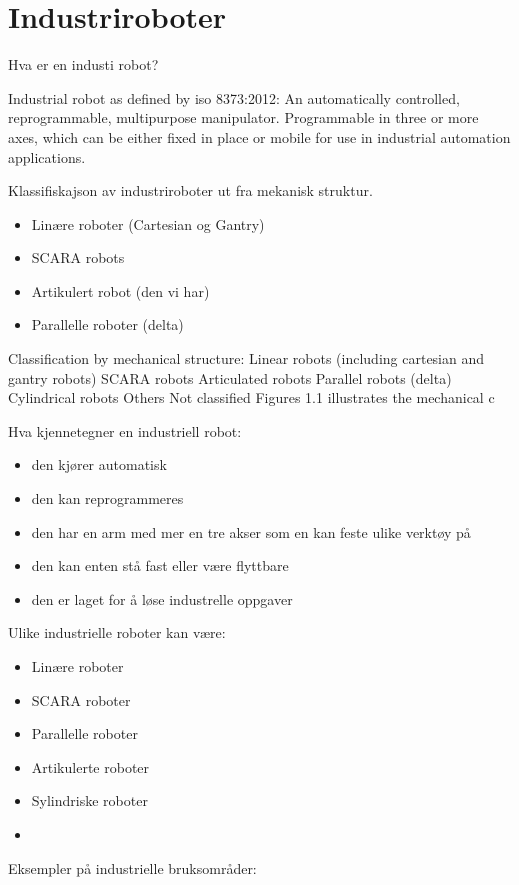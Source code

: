 
\section{Industriroboter}
Hva er en industi robot?

\vskip 5pt 
Industrial robot as defined by iso 8373:2012:
An automatically controlled, reprogrammable, multipurpose manipulator.
Programmable in three or more axes, which can be either fixed in place or mobile for use in industrial automation applications.

\vskip 5pt 
Klassifiskajson av industriroboter ut fra mekanisk struktur. 
\begin{itemize}[noitemsep]
	\item Linære roboter (Cartesian og Gantry)
	\item SCARA robots
	\item Artikulert robot (den vi har)
	\item Parallelle roboter (delta)
\end{itemize}


Classification by mechanical structure:
Linear robots (including cartesian and gantry robots)
SCARA robots
Articulated robots
Parallel robots (delta)
Cylindrical robots
Others
Not classified
Figures 1.1 illustrates the mechanical c

\vskip 10pt 
Hva kjennetegner en industriell robot:
\begin{itemize}[noitemsep]
\item den kjører automatisk
\item den kan reprogrammeres
\item den har en arm med mer en tre akser som en kan feste ulike verktøy på
\item den kan enten stå fast eller være flyttbare
\item den er laget for å løse industrelle oppgaver 
\end{itemize}

Ulike industrielle roboter kan være:
\begin{itemize}[noitemsep]
\item Linære roboter
\item SCARA roboter
\item Parallelle roboter
\item Artikulerte roboter
\item Sylindriske roboter
\item 
\end{itemize}

\vskip 10pt 
Eksempler på industrielle bruksområder:


